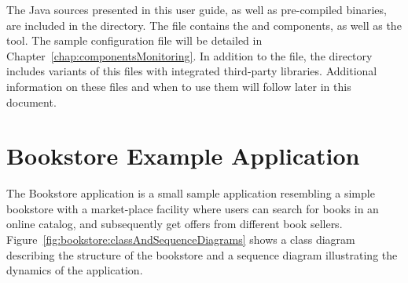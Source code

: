 \pagebreak

The Java sources presented in this user guide, as well as pre-compiled binaries, are included in the \file{\exampleDir/} directory. The file \file{\mainJar{}} contains the \KiekerMonitoringPart{} and \KiekerAnalysisPart{} components, as well as the \KiekerTraceAnalysis{} tool. The sample \KiekerMonitoringPart{}
configuration file %
\file{\kiekerExampleMonitoringProperties{}} will be detailed in Chapter~\ref{chap:componentsMonitoring}. %
In addition to the \file{\mainJar{}} file, the  directory includes %
variants of this  files with integrated third-party libraries. Additional %
information on these  files and when to use them will follow later in this document. %


\section{Bookstore Example Application}\label{sec:example:bookstore}

The Bookstore application is a small sample application resembling a simple bookstore with a market-place facility where users can search for books in an online catalog, and subsequently get offers from different book sellers.
Figure~\ref{fig:bookstore:classAndSequenceDiagrams} shows a class diagram describing the structure of the bookstore and a sequence diagram illustrating the dynamics of the application.

